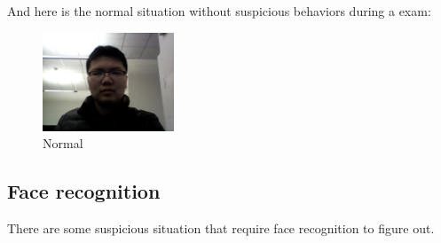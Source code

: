 \documentclass[11pt,letterpaper]{article}
\begin{document}
And here is the normal situation without suspicious behaviors during a exam:

\begin{figure}[htb!]
  \centering
    \includegraphics[width=0.35\textwidth]{normal}
	\caption{Normal}
\end{figure}

\subsection{Face recognition}

There are some suspicious situation that require face recognition to figure out.
\end{document}
